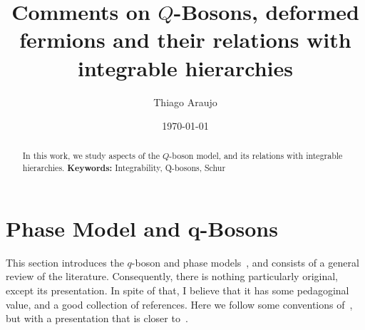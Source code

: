 \documentclass[a4paper,11pt]{amsart}
\begin{document}

\title{Comments on \(Q\)-Bosons, deformed fermions and their relations
    with integrable hierarchies}

\author{Thiago Araujo}

\address{\noindent 
Instituto de Física Teórica, UNESP-Universidade Estadual Paulista
R. Dr. Bento T. Ferraz 271, Bl. II, Sao Paulo 01140-070, SP, Brazil\\
and
Instituto de Física\\ Universidade de S\~ao Paulo\\ 
Rua do Matão Travessa 1371, 05508-090\\ São Paulo, SP. Brazil
}


\date{\today}

\begin{abstract}
  In this work, we study aspects of the \(Q\)-boson model, and 
its relations with integrable hierarchies. 
 \noindent \textbf{Keywords:} Integrability, Q-bosons, Schur
\end{abstract}

\maketitle

\setcounter{tocdepth}{1}
\tableofcontents

\section{Phase Model and q-Bosons}

This section introduces the \(q\)-boson and phase
models~\cite{Bogoliubov:1992, Bogoliubov:1997soj, Bogoliubov2005,
  Bogoliubov:1997soj, Tsilevich:2006}, and consists of a general
review of the literature. Consequently, there is nothing particularly
original, except its presentation.  In spite of that, I believe that
it has some pedagoginal value, and a good collection of references.
Here we follow some conventions of~\cite{Wheeler:2010vmq}, but with a
presentation that is closer to~\cite{Tsilevich:2006}.
\end{document}

